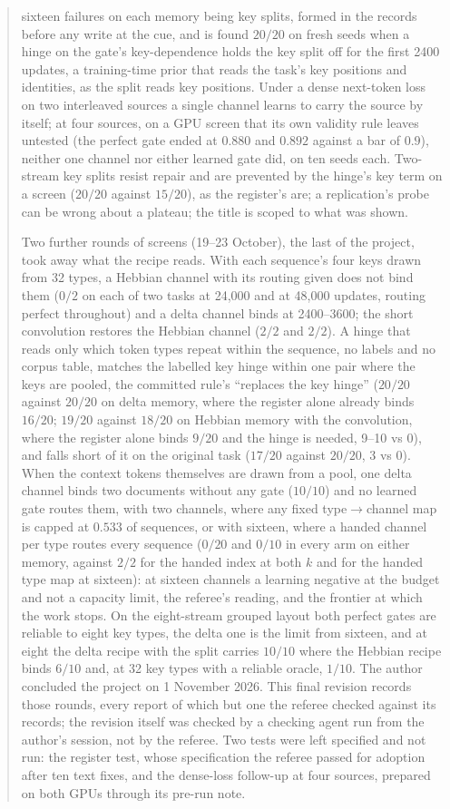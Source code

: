 \documentclass[11pt]{article}
\begin{document}
\begin{abstract}
sixteen failures on each memory being key splits, formed in the records before any write at the cue, and is found $20/20$ on fresh seeds when a hinge on the gate's key-dependence holds the key split off for the first 2400 updates, a training-time prior that reads the task's key positions and identities, as the split reads key positions. Under a dense next-token loss on two interleaved sources a single channel learns to carry the source by itself; at four sources, on a GPU screen that its own validity rule leaves untested (the perfect gate ended at $0.880$ and $0.892$ against a bar of $0.9$), neither one channel nor either learned gate did, on ten seeds each. Two-stream key splits resist repair and are prevented by the hinge's key term on a screen ($20/20$ against $15/20$), as the register's are; a replication's probe can be wrong about a plateau; the title is scoped to what was shown.

Two further rounds of screens (19--23 October), the last of the project, took away what the recipe reads. With each sequence's four keys drawn from 32 types, a Hebbian channel with its routing given does not bind them ($0/2$ on each of two tasks at 24{,}000 and at 48{,}000 updates, routing perfect throughout) and a delta channel binds at 2400--3600; the short convolution restores the Hebbian channel ($2/2$ and $2/2$). A hinge that reads only which token types repeat within the sequence, no labels and no corpus table, matches the labelled key hinge within one pair where the keys are pooled, the committed rule's ``replaces the key hinge'' ($20/20$ against $20/20$ on delta memory, where the register alone already binds $16/20$; $19/20$ against $18/20$ on Hebbian memory with the convolution, where the register alone binds $9/20$ and the hinge is needed, 9--10 vs 0), and falls short of it on the original task ($17/20$ against $20/20$, 3 vs 0). When the context tokens themselves are drawn from a pool, one delta channel binds two documents without any gate ($10/10$) and no learned gate routes them, with two channels, where any fixed type$\to$channel map is capped at $0.533$ of sequences, or with sixteen, where a handed channel per type routes every sequence ($0/20$ and $0/10$ in every arm on either memory, against $2/2$ for the handed index at both $k$ and for the handed type map at sixteen): at sixteen channels a learning negative at the budget and not a capacity limit, the referee's reading, and the frontier at which the work stops. On the eight-stream grouped layout both perfect gates are reliable to eight key types, the delta one is the limit from sixteen, and at eight the delta recipe with the split carries $10/10$ where the Hebbian recipe binds $6/10$ and, at 32 key types with a reliable oracle, $1/10$. The author concluded the project on 1 November 2026. This final revision records those rounds, every report of which but one the referee checked against its records; the revision itself was checked by a checking agent run from the author's session, not by the referee. Two tests were left specified and not run: the register test, whose specification the referee passed for adoption after ten text fixes, and the dense-loss follow-up at four sources, prepared on both GPUs through its pre-run note.
\end{abstract}
\end{document}

